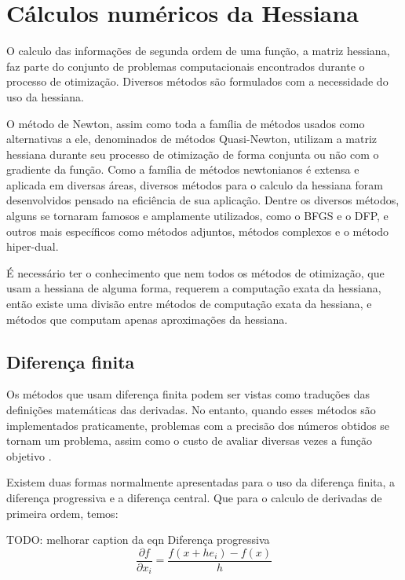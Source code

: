






\section{Cálculos numéricos da Hessiana}
O calculo das informações de segunda ordem de uma função, a matriz hessiana, faz parte do conjunto
de problemas computacionais encontrados durante o processo de otimização. Diversos métodos são
formulados com a necessidade do uso da hessiana.

O método de Newton, assim como toda a família de métodos usados como alternativas a ele,
denominados de métodos Quasi-Newton, utilizam a matriz hessiana durante seu processo de otimização
de forma conjunta ou não com o gradiente da função. Como a família de métodos newtonianos é extensa e
aplicada em diversas áreas, diversos métodos para o calculo da hessiana foram desenvolvidos
pensado na eficiência de sua aplicação. Dentre os diversos métodos, alguns se tornaram famosos
e amplamente utilizados, como o BFGS e o DFP, e outros mais específicos como métodos adjuntos,
métodos complexos e o método hiper-dual.

É necessário ter o conhecimento que nem todos os métodos de otimização, que usam a hessiana de
alguma forma, requerem a computação exata da hessiana, então existe uma divisão entre métodos
de computação exata da hessiana, e métodos que computam apenas aproximações da hessiana.


\subsection{Diferença finita}
Os métodos que usam diferença finita podem ser vistas como traduções das definições matemáticas
das derivadas. No entanto, quando esses métodos são implementados praticamente, problemas com a
precisão dos números obtidos se tornam um problema, assim como o custo de avaliar diversas
vezes a função objetivo \cite{caplan2011numerical}.

Existem duas formas normalmente apresentadas para o uso da diferença finita, a diferença
progressiva e a diferença central. Que para o calculo de derivadas de primeira ordem, temos:


TODO: melhorar caption da eqn Diferença progressiva
\begin{equation*}
\frac{\partial f}{\partial x_i} = \frac{f(x+he_i) - f(x)}{h}
\end{equation*}

